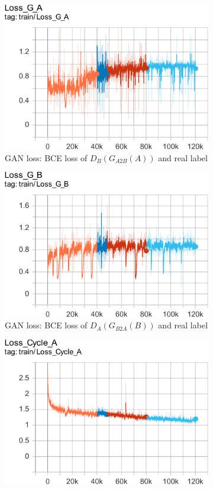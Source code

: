 \documentclass[10pt,twocolumn,letterpaper]{article}
\begin{document}
\begin{figure}[h]
\begin{subfigure}{.24\linewidth}
      \includegraphics[width=\linewidth]{cyclegan-loss_g_a}
      \caption{GAN loss: BCE loss of $D_B(G_{A2B}(A))$ and real label}
   \end{subfigure}
   \begin{subfigure}{.24\linewidth}
      \centering
      \includegraphics[width=\linewidth]{cyclegan-loss_g_b}
      \caption{GAN loss: BCE loss of $D_A(G_{B2A}(B))$ and real label}
   \end{subfigure}
   \begin{subfigure}{.24\linewidth}
      \centering
      \includegraphics[width=\linewidth]{cyclegan-loss_cycle_a}

\end{subfigure}
\end{figure}
\end{document}
